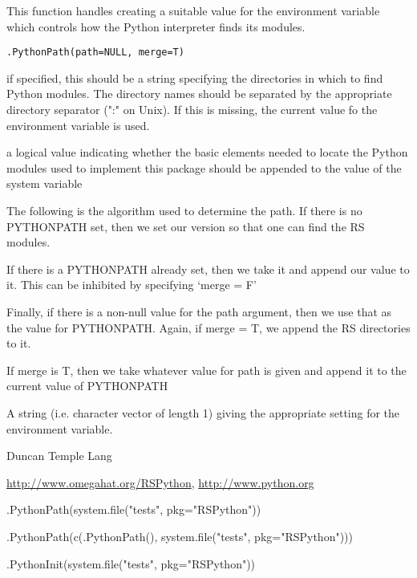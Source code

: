 \begin{Description}\relax
This function handles creating a suitable value for
the  environment variable which controls
how the Python interpreter finds its modules.\end{Description}
\begin{Usage}
\begin{verbatim}
.PythonPath(path=NULL, merge=T)
\end{verbatim}
\end{Usage}
\begin{Arguments}
\begin{ldescription}
\item[\code{path}] if specified, this should be a string specifying the directories
in which to find Python modules. The directory names should be separated by the appropriate
directory separator (":" on Unix). If this is missing, the current value fo 
the  environment variable is used.
\item[\code{merge}] a logical value indicating whether the basic elements needed
to locate the Python modules used to implement this package should be appended
to the value of the system variable 
\end{ldescription}
\end{Arguments}
\begin{Details}\relax
The following is the algorithm used to determine the
path.
If there is no PYTHONPATH set, then we set our version so that
one can find the RS modules.

If there is a PYTHONPATH already set, then we take it and append
our value to it. This can be inhibited by specifying `merge = F'

Finally, if there is a non-null value for the path argument, then 
we use that as the value for PYTHONPATH. Again, if merge = T, we 
append the RS directories to it.

If merge is T, then we take whatever value for path is given
and append it to the current value of PYTHONPATH\end{Details}
\begin{Value}
A string (i.e. character vector of length 1) giving the 
appropriate setting for the  environment variable.\end{Value}
\begin{Author}\relax
Duncan Temple Lang\end{Author}
\begin{References}\relax
\url{http://www.omegahat.org/RSPython},
\url{http://www.python.org}\end{References}
\begin{Examples}
\begin{ExampleCode}
 .PythonPath(system.file("tests", pkg="RSPython"))

 .PythonPath(c(.PythonPath(), system.file("tests", pkg="RSPython")))


 .PythonInit(system.file("tests", pkg="RSPython"))

\end{ExampleCode}
\end{Examples}

